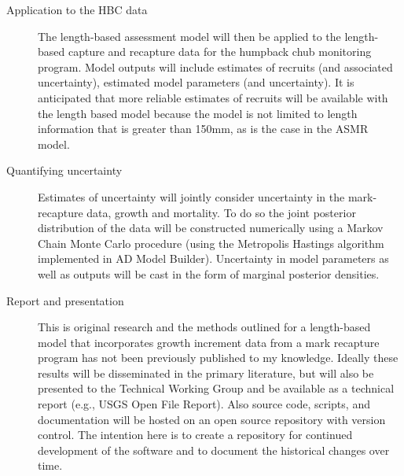 \begin{description}
	\item[Application to the HBC data] The length-based assessment model will then be applied to the length-based capture and recapture data for the humpback chub monitoring program.  Model outputs will include estimates of recruits (and associated uncertainty), estimated model parameters (and uncertainty).  It is  anticipated that more reliable estimates of recruits will be available with the length based model because the model is not limited to length information that is greater than 150mm, as is the case in the ASMR model.
	
	\item[Quantifying uncertainty] Estimates of uncertainty will jointly consider uncertainty in the mark-recapture data, growth and mortality.  To do so the joint posterior distribution of the data will be constructed numerically using a Markov Chain Monte Carlo procedure (using the Metropolis Hastings algorithm implemented in AD Model Builder).  Uncertainty in model parameters as well as outputs will be cast in the form of marginal posterior densities.
	
	\item[Report and presentation] This is original research and the methods outlined for a length-based model that incorporates growth increment data from a mark recapture program has not been previously published to my knowledge. Ideally these results will be disseminated in the primary literature, but will also be presented to the Technical Working Group and be available as a technical report (e.g., USGS Open File Report).  Also source code, scripts, and documentation will be hosted on an open source repository with version control.  The intention here is to create a repository for continued development of the software and to document the historical changes over time.
\end{description}
